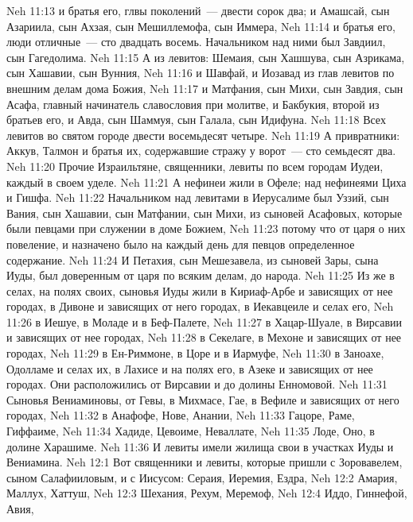 \vs Neh 11:13 и братья его, глвы поколений~--- двести сорок два; и Амашсай, сын Азариила, сын Ахзая, сын Мешиллемофа, сын Иммера,
\vs Neh 11:14 и братья его, люди отличные~--- сто двадцать восемь. Начальником над ними был Завдиил, сын Гагедолима.
\vs Neh 11:15 А из левитов: Шемаия, сын Хашшува, сын Азрикама, сын Хашавии, сын Вунния,
\vs Neh 11:16 и Шавфай, и Иозавад из глав левитов по внешним делам дома Божия,
\vs Neh 11:17 и Матфания, сын Михи, сын Завдия, сын Асафа, главный начинатель славословия при молитве, и Бакбукия, второй  из братьев его, и Авда, сын Шаммуя, сын Галала, сын Идифуна.
\vs Neh 11:18 Всех левитов во святом городе двести восемьдесят четыре.
\vs Neh 11:19 А привратники: Аккув, Талмон и братья их, содержавшие стражу у ворот~--- сто семьдесят два.
\rsbpar\vs Neh 11:20 Прочие Израильтяне, священники, левиты  по всем городам Иудеи, каждый в своем уделе.
\vs Neh 11:21 А нефинеи жили в Офеле; над нефинеями Циха и Гишфа.
\vs Neh 11:22 Начальником над левитами в Иерусалиме был Уззий, сын Вания, сын Хашавии, сын Матфании, сын Михи, из сыновей Асафовых, которые были певцами при служении в доме Божием,
\vs Neh 11:23 потому что от царя  о них  повеление, и назначено было на каждый день для певцов определенное содержание.
\vs Neh 11:24 И Петахия, сын Мешезавела, из сыновей Зары, сына Иуды, был доверенным от царя по всяким делам,  до народа.
\vs Neh 11:25 Из  же в селах, на полях своих, сыновья Иуды жили в Кириаф-Арбе и зависящих от нее городах, в Дивоне и зависящих от него городах, в Иекавцеиле и селах его,
\vs Neh 11:26 в Иешуе, в Моладе и в Беф-Палете,
\vs Neh 11:27 в Хацар-Шуале, в Вирсавии и зависящих от нее городах,
\vs Neh 11:28 в Секелаге, в Мехоне и зависящих от нее городах,
\vs Neh 11:29 в Ен-Риммоне, в Цоре и в Иармуфе,
\vs Neh 11:30 в Заноахе, Одолламе и селах их, в Лахисе и на полях его, в Азеке и зависящих от нее городах. Они расположились от Вирсавии и до долины Енномовой.
\vs Neh 11:31 Сыновья Вениаминовы,  от Гевы, в Михмасе, Гае, в Вефиле и зависящих от него городах,
\vs Neh 11:32 в Анафофе, Нове, Анании,
\vs Neh 11:33 Гацоре, Раме, Гиффаиме,
\vs Neh 11:34 Хадиде, Цевоиме, Неваллате,
\vs Neh 11:35 Лоде, Оно, в долине Харашиме.
\vs Neh 11:36 И левиты имели жилища свои в участках Иуды и Вениамина.
\vs Neh 12:1 Вот священники и левиты, которые пришли с Зоровавелем, сыном Салафииловым, и с Иисусом: Сераия, Иеремия, Ездра,
\vs Neh 12:2 Амария, Маллух, Хаттуш,
\vs Neh 12:3 Шехания, Рехум, Меремоф,
\vs Neh 12:4 Иддо, Гиннефой, Авия,
